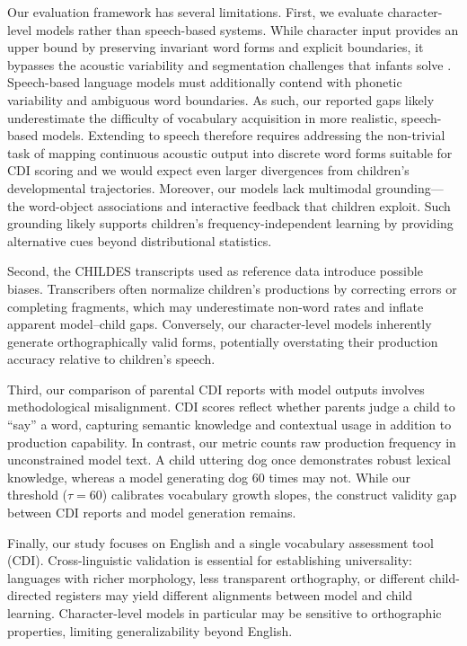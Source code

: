 Our evaluation framework has several limitations. First, we evaluate character-level models rather than speech-based systems. While character input provides an upper bound by preserving invariant word forms and explicit boundaries, it bypasses the acoustic variability and segmentation challenges that infants solve \citep{dupoux2018cognitive}. Speech-based language models \citep{lakhotia2021generative,nguyen2024spirit} must additionally contend with phonetic variability and ambiguous word boundaries. As such, our reported gaps likely underestimate the difficulty of vocabulary acquisition in more realistic, speech-based models. Extending \meCDI{} to speech therefore requires addressing the non-trivial task of mapping continuous acoustic output into discrete word forms suitable for CDI scoring and we would expect even larger divergences from children's developmental trajectories. Moreover, our models lack multimodal grounding—the word-object associations and interactive feedback that children exploit. Such grounding likely supports children’s frequency-independent learning by providing alternative cues beyond distributional statistics.

Second, the CHILDES transcripts used as reference data introduce possible biases. Transcribers often normalize children’s productions by correcting errors or completing fragments, which may underestimate non-word rates and inflate apparent model–child gaps. Conversely, our character-level models inherently generate orthographically valid forms, potentially overstating their production accuracy relative to children’s speech.


Third, our comparison of parental CDI reports with model outputs involves methodological misalignment. CDI scores reflect whether parents judge a child to “say” a word, capturing semantic knowledge and contextual usage in addition to production capability. In contrast, our \meCDI{} metric counts raw production frequency in unconstrained model text. A child uttering dog once demonstrates robust lexical knowledge, whereas a model generating dog 60 times may not. While our threshold ($\tau = 60$) calibrates vocabulary growth slopes, the construct validity gap between CDI reports and model generation remains.


Finally, our study focuses on English and a single vocabulary assessment tool (CDI). Cross-linguistic validation is essential for establishing universality: languages with richer morphology, less transparent orthography, or different child-directed registers may yield different alignments between model and child learning. Character-level models in particular may be sensitive to orthographic properties, limiting generalizability beyond English.


